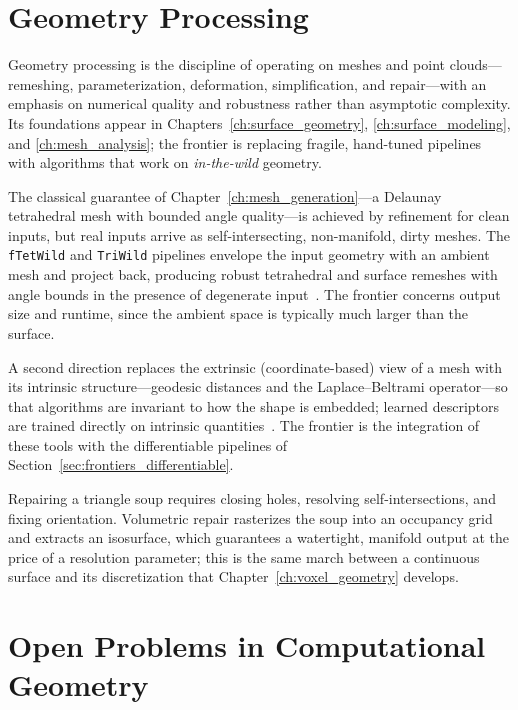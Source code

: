 \section{Geometry Processing}
\label{sec:frontiers_processing}

Geometry processing is the discipline of operating
on meshes and point clouds---remeshing, parameterization, deformation,
simplification, and repair---with an emphasis on numerical quality and
robustness rather than asymptotic complexity. Its foundations appear in
Chapters~\ref{ch:surface_geometry}, \ref{ch:surface_modeling}, and
\ref{ch:mesh_analysis}; the frontier is replacing fragile, hand-tuned
pipelines with algorithms that work on \emph{in-the-wild} geometry.

The classical guarantee of Chapter~\ref{ch:mesh_generation}---a Delaunay
tetrahedral mesh with bounded angle quality---is achieved by refinement for
clean inputs, but real inputs arrive as self-intersecting, non-manifold, dirty
meshes. The \texttt{fTetWild} and \texttt{TriWild} pipelines envelope the
input geometry with an ambient mesh and project back, producing robust
tetrahedral and surface remeshes with angle bounds in the presence of
degenerate input~\cite{hu2018,hu2021}. The frontier concerns output size and
runtime, since the ambient space is typically much larger than the surface.

A second direction replaces the extrinsic (coordinate-based) view of a mesh
with its intrinsic structure---geodesic distances and the Laplace--Beltrami
operator---so that algorithms are invariant to how the shape is embedded;
learned descriptors are trained directly on intrinsic
quantities~\cite{sharp2025}. The frontier is the integration of these tools
with the differentiable pipelines of Section~\ref{sec:frontiers_differentiable}.

\begin{example}\label{ex:frontiers_mesh_repair}
Repairing a triangle soup requires closing holes, resolving self-intersections,
and fixing orientation. Volumetric repair rasterizes the soup into an occupancy
grid and extracts an isosurface, which guarantees a watertight, manifold output
at the price of a resolution parameter; this is the same march between a
continuous surface and its discretization that Chapter~\ref{ch:voxel_geometry}
develops.
\end{example}

\section{Open Problems in Computational Geometry}
\label{sec:frontiers_open_problems}

